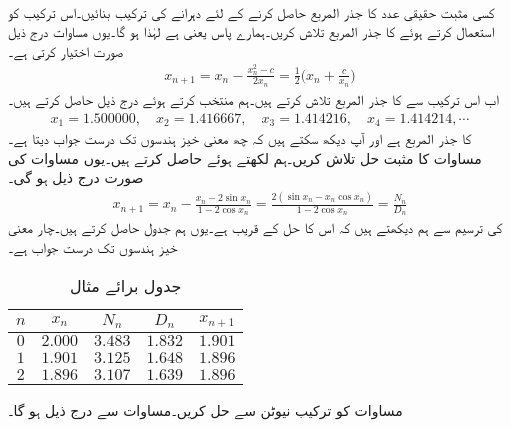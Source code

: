 \quad {}\\
کسی مثبت حقیقی عدد  کا جذر المربع حاصل کرنے کے لئے دہرانے کی ترکیب بنائیں۔اس ترکیب کو استعمال کرتے ہوئے  کا جذر المربع تلاش کریں۔ہمارے پاس   یعنی  ہے لہٰذا  ہو گا۔یوں مساوات  درج ذیل صورت اختیار کرتی ہے۔
\begin{align*}
x_{n+1}=x_n-\frac{x_n^2-c}{2x_n}=\frac{1}{2}\big(x_n+\frac{c}{x_n}\big)
\end{align*}
اب اس ترکیب سے  کا جذر المربع تلاش کرتے ہیں۔ہم  منتخب کرتے ہوئے درج ذیل حاصل کرتے ہیں۔
\begin{align*}
x_1=\num{1.500000},\quad x_2=\num{1.416667},\quad x_3=\num{1.414216},\quad x_4=\num{1.414214},\cdots
\end{align*}
 کا جذر المربع  ہے اور آپ دیکھ سکتے ہیں کہ  چھ معنی خیز ہندسوں تک درست جواب دیتا ہے۔
\quad {}\\
مساوات  کا مثبت حل تلاش کریں۔ہم  لکھتے ہوئے  حاصل کرتے ہیں۔یوں مساوات  کی صورت درج ذیل ہو گی۔
\begin{align*}
x_{n+1}=x_n-\frac{x_n-2\sin x_n}{1-2\cos x_n}=\frac{2(\sin x_n-x_n\cos x_n)}{1-2\cos x_n}=\frac{N_n}{D_n}
\end{align*}
 کی ترسیم سے ہم دیکھتے ہیں کہ اس کا حل  کے قریب ہے۔یوں ہم جدول  حاصل کرتے ہیں۔چار معنی خیز ہندسوں تک درست جواب  ہے۔
\begin{table}
\caption{جدول برائے مثال }
\label{جدول_مثال_اعدادی_ماورائی_الف}
\centering
\begin{tabular}{c|cccc}
$n$& $x_n$& $N_n$ &$D_n$  & $x_{n+1}$\\
\midrule
$0$& $2.000$& $3.483$ & $1.832$ & $1.901$\\
$1$& $1.901$ & $3.125$ & $1.648$ & $1.896$\\
$2$& $1.896$ & $3.107$ & $1.639$ & $1.896$
\end{tabular}
\end{table}
\quad {}
مساوات  کو ترکیب نیوٹن سے حل کریں۔مساوات  سے درج ذیل ہو گا۔
